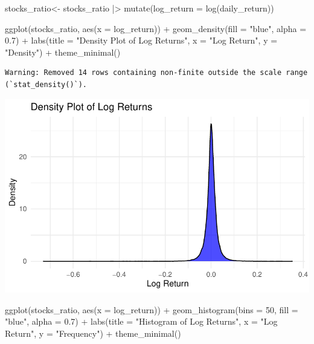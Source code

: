 \documentclass[
  letterpaper,
  DIV=11,
  numbers=noendperiod]{scrartcl}
\newenvironment{Shaded}{\begin{snugshade}}{\end{snugshade}}
\newcommand{\AttributeTok}[1]{\textcolor[rgb]{0.40,0.45,0.13}{#1}}
\newcommand{\DecValTok}[1]{\textcolor[rgb]{0.68,0.00,0.00}{#1}}
\newcommand{\FloatTok}[1]{\textcolor[rgb]{0.68,0.00,0.00}{#1}}
\newcommand{\FunctionTok}[1]{\textcolor[rgb]{0.28,0.35,0.67}{#1}}
\newcommand{\NormalTok}[1]{\textcolor[rgb]{0.00,0.23,0.31}{#1}}
\newcommand{\OtherTok}[1]{\textcolor[rgb]{0.00,0.23,0.31}{#1}}
\newcommand{\SpecialCharTok}[1]{\textcolor[rgb]{0.37,0.37,0.37}{#1}}
\newcommand{\StringTok}[1]{\textcolor[rgb]{0.13,0.47,0.30}{#1}}
\begin{document}
\begin{Shaded}
\begin{Highlighting}[]
\NormalTok{stocks\_ratio}\OtherTok{\textless{}{-}}\NormalTok{ stocks\_ratio }\SpecialCharTok{|\textgreater{}}
  \FunctionTok{mutate}\NormalTok{(}\AttributeTok{log\_return =} \FunctionTok{log}\NormalTok{(daily\_return))}

  \FunctionTok{ggplot}\NormalTok{(stocks\_ratio, }\FunctionTok{aes}\NormalTok{(}\AttributeTok{x =}\NormalTok{ log\_return)) }\SpecialCharTok{+}
  \FunctionTok{geom\_density}\NormalTok{(}\AttributeTok{fill =} \StringTok{"blue"}\NormalTok{, }\AttributeTok{alpha =} \FloatTok{0.7}\NormalTok{) }\SpecialCharTok{+}
  \FunctionTok{labs}\NormalTok{(}\AttributeTok{title =} \StringTok{"Density Plot of Log Returns"}\NormalTok{, }\AttributeTok{x =} \StringTok{"Log Return"}\NormalTok{, }\AttributeTok{y =} \StringTok{"Density"}\NormalTok{) }\SpecialCharTok{+}
  \FunctionTok{theme\_minimal}\NormalTok{()}
\end{Highlighting}
\end{Shaded}

\begin{verbatim}
Warning: Removed 14 rows containing non-finite outside the scale range
(`stat_density()`).
\end{verbatim}

\includegraphics{Lab4_files/figure-pdf/problem 2-1.pdf}

\begin{Shaded}
\begin{Highlighting}[]
  \FunctionTok{ggplot}\NormalTok{(stocks\_ratio, }\FunctionTok{aes}\NormalTok{(}\AttributeTok{x =}\NormalTok{ log\_return)) }\SpecialCharTok{+}
  \FunctionTok{geom\_histogram}\NormalTok{(}\AttributeTok{bins =} \DecValTok{50}\NormalTok{, }\AttributeTok{fill =} \StringTok{"blue"}\NormalTok{, }\AttributeTok{alpha =} \FloatTok{0.7}\NormalTok{) }\SpecialCharTok{+}
  \FunctionTok{labs}\NormalTok{(}\AttributeTok{title =} \StringTok{"Histogram of Log Returns"}\NormalTok{, }\AttributeTok{x =} \StringTok{"Log Return"}\NormalTok{, }\AttributeTok{y =} \StringTok{"Frequency"}\NormalTok{) }\SpecialCharTok{+}
  \FunctionTok{theme\_minimal}\NormalTok{()}
\end{Highlighting}
\end{Shaded}
\end{document}
